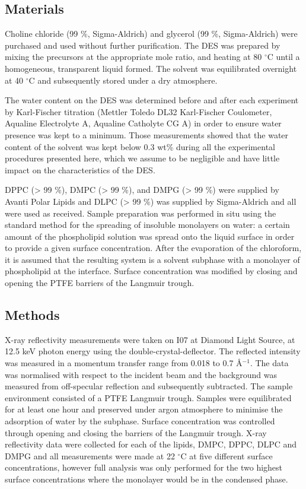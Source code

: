 \documentclass[twoside,twocolumn,9pt]{article}
\begin{document}
\subsection{Materials}
Choline chloride (99 \%, Sigma-Aldrich) and glycerol (99 \%, Sigma-Aldrich) were purchased and used without further purification. The DES was prepared by mixing the precursors at the appropriate mole ratio, and heating at 80 $^\circ$C until a homogeneous, transparent liquid formed.\cite{Smith2014} The solvent was equilibrated overnight at 40 $^\circ$C and subsequently stored under a dry atmosphere. 

The water content on the DES was determined before and after each experiment by Karl-Fischer titration (Mettler Toledo DL32 Karl-Fischer Coulometer, Aqualine Electrolyte A, Aqualine Catholyte CG A) in order to ensure water presence was kept to a minimum. Those measurements showed that the water content of the solvent was kept below 0.3 wt\% during all the experimental procedures presented here, which we assume to be negligible and have little impact on the characteristics of the DES.\cite{Hammond2016,Hammond2017}

DPPC (> 99 \%), DMPC (> 99 \%), and DMPG (> 99 \%) were supplied by Avanti Polar Lipids and DLPC (> 99 \%) was supplied by Sigma-Aldrich and all were used as received. Sample preparation was performed in situ using the standard method for the spreading of insoluble monolayers on water: a certain amount of the phospholipid solution was spread onto the liquid surface in order to provide a given surface concentration. After the evaporation of the chloroform, it is assumed that the resulting system is a solvent subphase with a monolayer of phospholipid at the interface. Surface concentration was modified by closing and opening the PTFE barriers of the Langmuir trough.

\subsection{Methods}
X-ray reflectivity measurements were taken on I07 at Diamond Light Source, at 12.5 keV photon energy using the double-crystal-deflector.\cite{Arnold2012} The reflected intensity was measured in a momentum transfer range from 0.018 to 0.7 \AA$^{-1}$. The data was normalised with respect to the incident beam and the background was measured from off-specular reflection and subsequently subtracted. The sample environment consisted of a PTFE Langmuir trough. Samples were equilibrated for at least one hour and preserved under argon atmosphere to minimise the adsorption of water by the subphase. Surface concentration was controlled through opening and closing the barriers of the Langmuir trough. X-ray reflectivity data were collected for each of the lipids, DMPC, DPPC, DLPC and DMPG and all measurements were made at 22 $^\circ$C at five different surface concentrations, however full analysis was only performed for the two highest surface concentrations where the monolayer would be in the condensed phase. 
\end{document}
